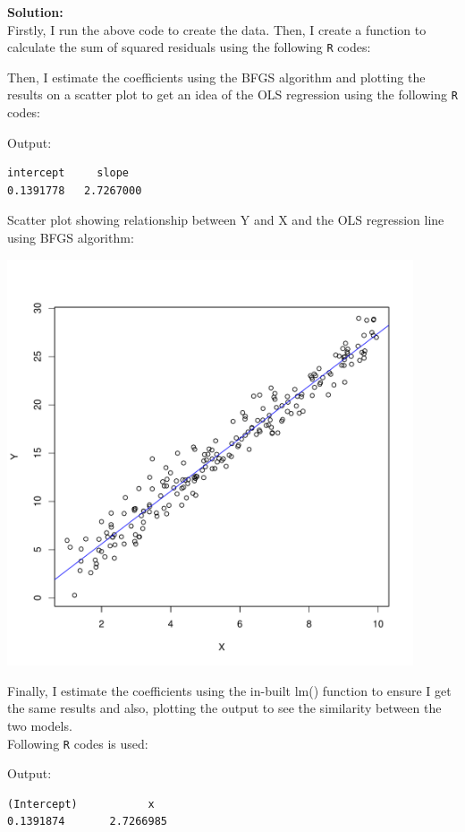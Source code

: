 \documentclass[12pt,letterpaper]{article}
\begin{document}
\vspace*{.2cm}
\noindent\textbf{Solution:\\}
Firstly, I run the above code to create the data. Then, I create a function to calculate the sum of squared residuals using the following \texttt{R} codes:


\noindent Then, I estimate the coefficients using the BFGS algorithm and plotting the results on a scatter plot to get an idea of the OLS regression using the following \texttt{R} codes:

\pagebreak
\noindent Output:
\begin{lstlisting}
intercept     slope 
0.1391778 	2.7267000 
\end{lstlisting}

\noindent Scatter plot showing relationship between Y and X and the OLS regression line using BFGS algorithm:
\begin{center}
	\includegraphics[width=12cm]{plot_Y_X_bfgs.pdf}  
\end{center}

\noindent Finally, I estimate the coefficients using the in-built lm() function to ensure I get the same results and also, plotting the output to see the similarity between the two models.\\
Following \texttt{R} codes is used:

\pagebreak
\noindent Output:
\begin{lstlisting}
(Intercept)           x 
0.1391874   	2.7266985 
\end{lstlisting}
\end{document}
